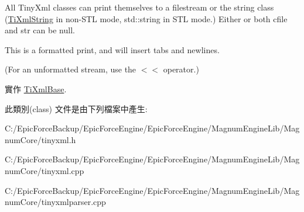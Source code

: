 All Tiny\+Xml classes can print themselves to a filestream or the string class (\hyperlink{class_ti_xml_string}{Ti\+Xml\+String} in non-\/\+S\+TL mode, std\+::string in S\+TL mode.) Either or both cfile and str can be null. 

This is a formatted print, and will insert tabs and newlines.

(For an unformatted stream, use the $<$$<$ operator.) 

實作 \hyperlink{class_ti_xml_base_aaea3e75b489fc3c937f3a7ef096069e7}{Ti\+Xml\+Base}.



此類別(class) 文件是由下列檔案中產生\+:\begin{DoxyCompactItemize}
\item 
C\+:/\+Epic\+Force\+Backup/\+Epic\+Force\+Engine/\+Epic\+Force\+Engine/\+Magnum\+Engine\+Lib/\+Magnum\+Core/tinyxml.\+h\item 
C\+:/\+Epic\+Force\+Backup/\+Epic\+Force\+Engine/\+Epic\+Force\+Engine/\+Magnum\+Engine\+Lib/\+Magnum\+Core/tinyxml.\+cpp\item 
C\+:/\+Epic\+Force\+Backup/\+Epic\+Force\+Engine/\+Epic\+Force\+Engine/\+Magnum\+Engine\+Lib/\+Magnum\+Core/tinyxmlparser.\+cpp\end{DoxyCompactItemize}
